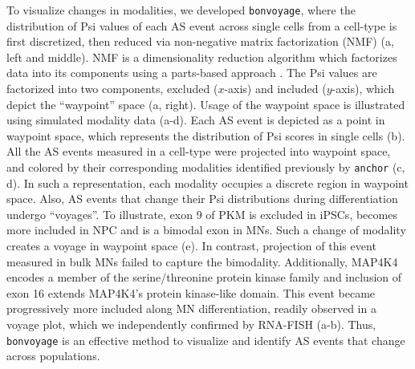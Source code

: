 To visualize changes in modalities, we developed \texttt{bonvoyage}, where the distribution of Psi values of each AS event across single cells from a cell-type is first discretized, then reduced via non-negative matrix factorization (NMF) (a, left and middle). NMF is a dimensionality reduction algorithm which factorizes data into its components using a parts-based approach \cite{Lee:1999gw}. The Psi values are factorized into two components, excluded ($x$-axis) and included ($y$-axis), which depict the ``waypoint'' space (a, right). Usage of the waypoint space is illustrated using simulated modality data (a-d). Each AS event is depicted as a point in waypoint space, which represents the distribution of Psi scores in single cells (b). All the AS events measured in a cell-type were projected into waypoint space, and colored by their corresponding modalities identified previously by \texttt{anchor} (c, d). In such a representation, each modality occupies a discrete region in waypoint space. Also, AS events that change their Psi distributions during differentiation undergo ``voyages''. To illustrate, exon 9 of PKM is excluded in iPSCs, becomes more included in NPC and is a bimodal exon in MNs. Such a change of modality creates a voyage in waypoint space (e). In contrast, projection of this event measured in bulk MNs failed to capture the bimodality. Additionally, MAP4K4 encodes a member of the serine/threonine protein kinase family and inclusion of exon 16 extends MAP4K4's protein kinase-like domain. This event became progressively more included along MN differentiation, readily observed in a voyage plot, which we independently confirmed by RNA-FISH (a-b). Thus, \texttt{bonvoyage} is an effective method to visualize and identify AS events that change across populations.




